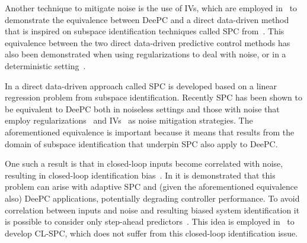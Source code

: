 Another technique to mitigate noise is the use of \ac{IVs}, which are employed in~\citep{vanWingerden2022} to demonstrate the equivalence between \ac{DeePC} and a direct data-driven method that is inspired on subspace identification techniques called \ac{SPC} from~\cite{Favoreel1999}. This equivalence between the two direct data-driven predictive control methods has  also been demonstrated when using regularizations to deal with noise, or in a deterministic setting~\citep{Fiedler2021}.

In \cite{Favoreel1999} a direct data-driven approach called \ac{SPC} is developed based on a linear regression problem from subspace identification. Recently \ac{SPC} has been shown to be equivalent to \ac{DeePC} %
both in noiseless settings and those with noise that employ regularizations~\citep{Fiedler2021} and \ac{IVs}~\citep{vanWingerden2022} as noise mitigation strategies. The aforementioned equivalence is important because it means that results from the domain of subspace identification that underpin \ac{SPC} also apply to \ac{DeePC}.

One such a result is that in closed-loop inputs become correlated with noise, resulting in closed-loop identification bias~\citep{Soderstrom1989a}. In \cite{Dinkla2023} it is demonstrated that this problem can arise with adaptive \ac{SPC} and (given the aforementioned equivalence also) \ac{DeePC} applications, potentially degrading controller performance. %
To avoid correlation between inputs and noise and resulting biased system identification it is possible to consider only step-ahead predictors~\citep{Ljung1996}. This idea is employed in~\cite{Dong2008} to develop \ac{CL-SPC}, which does not suffer from this closed-loop identification issue.

